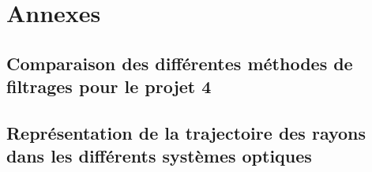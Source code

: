 \documentclass[a4paper,11pt]{article}
\begin{document}
\newpage
{}
\listoffigures
\newpage




\section*{Annexes}
\renewcommand{\thesubsection}{\Alph{subsection}}
\appendix
\subsection{Comparaison des différentes méthodes de filtrages pour le projet 4}
\subsection{Représentation de la trajectoire des rayons dans les différents systèmes optiques}
\end{document}
